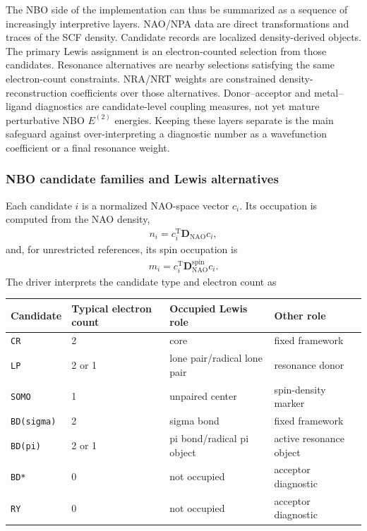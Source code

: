\documentclass[11pt]{article}
\newcommand{\nao}{\mathrm{NAO}}
\newcommand{\dens}{\mathbf{D}}
\begin{document}
The NBO side of the implementation can thus be summarized as a sequence of increasingly interpretive layers.  NAO/NPA data are direct transformations and traces of the SCF density.  Candidate records are localized density-derived objects.  The primary Lewis assignment is an electron-counted selection from those candidates.  Resonance alternatives are nearby selections satisfying the same electron-count constraints.  NRA/NRT weights are constrained density-reconstruction coefficients over those alternatives.  Donor--acceptor and metal--ligand diagnostics are candidate-level coupling measures, not yet mature perturbative NBO $E^{(2)}$ energies.  Keeping these layers separate is the main safeguard against over-interpreting a diagnostic number as a wavefunction coefficient or a final resonance weight.

\subsubsection*{NBO candidate families and Lewis alternatives}

Each candidate $i$ is a normalized NAO-space vector $c_i$.  Its occupation is computed from the NAO density,
\begin{equation}
\begin{aligned}
	n_i = c_i^{\mathrm{T}}\dens_{\nao}c_i,
\end{aligned}
\end{equation}
and, for unrestricted references, its spin occupation is
\begin{equation}
\begin{aligned}
	m_i = c_i^{\mathrm{T}}\dens_{\nao}^{\mathrm{spin}}c_i.
\end{aligned}
\end{equation}
The driver interprets the candidate type and electron count as
\begin{center}
\begin{tabular}{llll}
\toprule
Candidate & Typical electron count & Occupied Lewis role & Other role \\
\midrule
\texttt{CR} & 2 & core & fixed framework \\
\texttt{LP} & 2 or 1 & lone pair/radical lone pair & resonance donor \\
\texttt{SOMO} & 1 & unpaired center & spin-density marker \\
\texttt{BD(sigma)} & 2 & sigma bond & fixed framework \\
\texttt{BD(pi)} & 2 or 1 & pi bond/radical pi object & active resonance object \\
\texttt{BD*} & 0 & not occupied & acceptor diagnostic \\
\texttt{RY} & 0 & not occupied & acceptor diagnostic \\
\bottomrule
\end{tabular}
\end{center}
\end{document}

